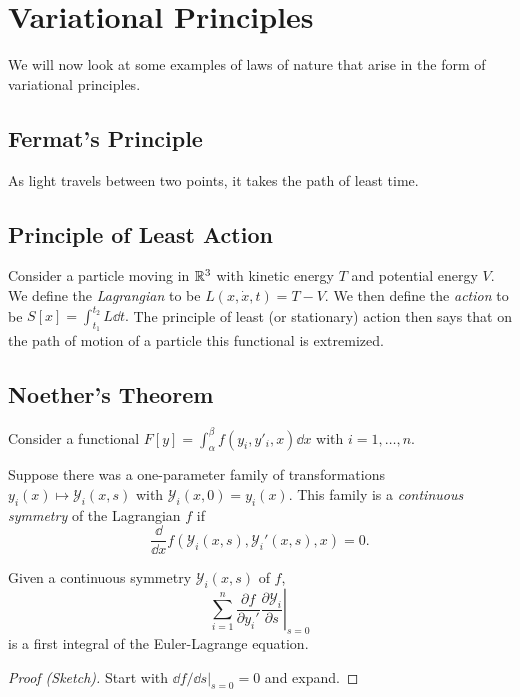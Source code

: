 \documentclass[a4paper]{amsart}
\begin{document}
\section{Variational Principles}

We will now look at some examples of laws of nature that arise in the form of variational principles.

\subsection*{Fermat's Principle} 

As light travels between two points, it takes the path of least time.

\subsection*{Principle of Least Action} 

Consider a particle moving in $\mathbb{R}^3$ with kinetic energy $T$ and potential energy $V$. We define the \emph{Lagrangian} to be
$
L(x, \dot{x}, t) = T - V.
$
We then define the \emph{action} to be
$
S[x] = \int_{t_1}^{t_2} L \dd t.
$
The principle of least (or stationary) action then says that on the path of motion of a particle this functional is extremized.

\subsection*{Noether's Theorem}

Consider a functional
$
F[y] = \int_{\alpha}^{\beta} f(y_i, y'_i, x) \dd x$ with $i = 1, \dots, n$.

Suppose there was a one-parameter family of transformations $y_i(x)\mapsto \mathcal{Y}_i(x, s)$ with $\mathcal{Y}_i(x, 0) = y_i(x)$. This family is a \emph{continuous symmetry} of the Lagrangian $f$ if
$$
\frac{\dd}{\dd x} f(\mathcal{Y}_i(x, s), \mathcal{Y}_i'(x, s), x) = 0.
$$

\begin{theorem}
	Given a continuous symmetry $\mathcal{Y}_i(x, s)$ of $f$,
	$$
		\sum_{i = 1}^n \left.\frac{\partial f}{\partial y_i'} \frac{\partial \mathcal{Y}_i}{\partial s} \right|_{s = 0}
	$$
	is a first integral of the Euler-Lagrange equation.
\end{theorem}
\begin{proof}[Proof (Sketch)]
	Start with $\left.\dd f/\dd s \right|_{s = 0} = 0$ and expand.
\end{proof}
\end{document}

